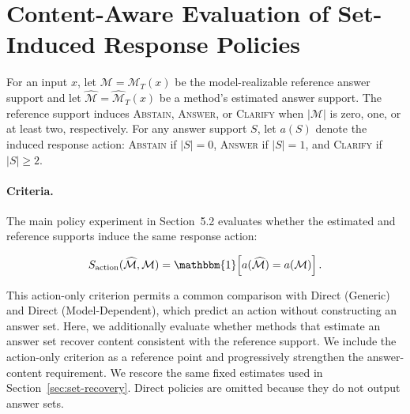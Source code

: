 \begin{table}[t]
    \centering
    \caption{Macro set $F_1$ and exact set match (EM) (\%) for recovering $\mathcal{M}_T(x)$ on 100 unambiguous AmbigQA questions. Green and orange mark the best and second-best method, respectively.}
    \label{tab:single-answer-qa}
    \vspace{3pt}
    \setlength{\tabcolsep}{2pt}
    \resizebox{\columnwidth}{!}{%
    }
\end{table}


\FloatBarrier





\section{Content-Aware Evaluation of Set-Induced Response Policies}
\label{app:response-policy-criteria}

For an input $x$, let $\mathcal{M}=\mathcal{M}_T(x)$ be the model-realizable reference answer support and let $\widehat{\mathcal{M}}=\widehat{\mathcal{M}}_T(x)$ be a method's estimated answer support. The reference support induces \textsc{Abstain}, \textsc{Answer}, or \textsc{Clarify} when $|\mathcal{M}|$ is zero, one, or at least two, respectively. For any answer support \(S\), let \(a(S)\) denote the induced response action: \textsc{Abstain} if \(|S|=0\), \textsc{Answer} if \(|S|=1\), and \textsc{Clarify} if \(|S|\geq 2\).

\paragraph{Criteria.} 
The main policy experiment in Section~5.2 evaluates whether the estimated and reference supports induce the same response action:

\[
S_{\mathrm{action}}(\widehat{\mathcal{M}},\mathcal{M})
=
\mathbbm{1}\!\left[
a(\widehat{\mathcal{M}})=a(\mathcal{M})
\right].
\]

This action-only criterion permits a common comparison with Direct (Generic) and Direct (Model-Dependent), which predict an action without constructing an answer set. Here, we additionally evaluate whether methods that estimate an answer set recover content consistent with the reference support. We include the action-only criterion as a reference point and progressively strengthen the answer-content requirement. We rescore the same fixed estimates used in Section~\ref{sec:set-recovery}. Direct policies are omitted because they do not output answer sets.

